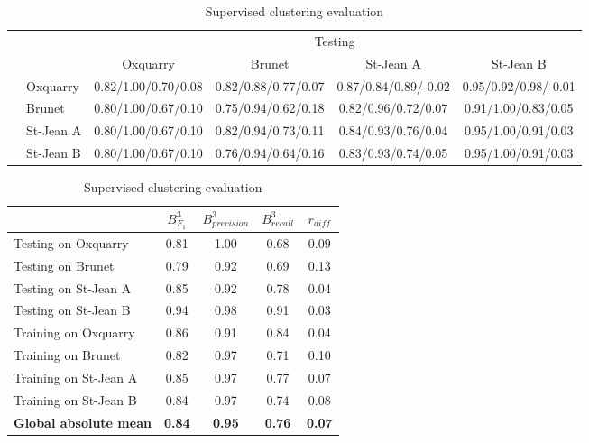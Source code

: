 \begin{table}
  \centering
  \caption{Supervised clustering evaluation}
  \label{tab:supervised_clustering}

  \label{tab:supervised_clustering_train_test}
  \begin{tabular}{l l| c c c c}
    \toprule
    \multicolumn{2}{c}{\multirow{2}{*}{}} & \multicolumn{4}{c}{Testing} \\
    \multicolumn{2}{c}{} & Oxquarry & Brunet & St-Jean A & St-Jean B \\
    \midrule
    \parbox[t]{2mm}{}
    & Oxquarry
    & 0.82/1.00/0.70/0.08
    & 0.82/0.88/0.77/0.07
    & 0.87/0.84/0.89/-0.02
    & 0.95/0.92/0.98/-0.01
    \\
    & Brunet
    & 0.80/1.00/0.67/0.10
    & 0.75/0.94/0.62/0.18
    & 0.82/0.96/0.72/0.07
    & 0.91/1.00/0.83/0.05
    \\
    & St-Jean A
    & 0.80/1.00/0.67/0.10
    & 0.82/0.94/0.73/0.11
    & 0.84/0.93/0.76/0.04
    & 0.95/1.00/0.91/0.03
    \\
    & St-Jean B
    & 0.80/1.00/0.67/0.10
    & 0.76/0.94/0.64/0.16
    & 0.83/0.93/0.74/0.05
    & 0.95/1.00/0.91/0.03
    \\
    \bottomrule
  \end{tabular}

  \vspace{0.5cm}

  \label{tab:supervised_clustering_average}
  \begin{tabular}{l c c c c}
    \toprule
    & $B^{3}_{F_1}$
    & $B^{3}_{precision}$
    & $B^{3}_{recall}$
    & $r_{diff}$ \\
    \midrule
    Testing on Oxquarry     & 0.81 & 1.00 & 0.68 & 0.09 \\
    Testing on Brunet       & 0.79 & 0.92 & 0.69 & 0.13 \\
    Testing on St-Jean A    & 0.85 & 0.92 & 0.78 & 0.04 \\
    Testing on St-Jean B    & 0.94 & 0.98 & 0.91 & 0.03 \\
    Training on Oxquarry    & 0.86 & 0.91 & 0.84 & 0.04 \\
    Training on Brunet      & 0.82 & 0.97 & 0.71 & 0.10 \\
    Training on St-Jean A   & 0.85 & 0.97 & 0.77 & 0.07 \\
    Training on St-Jean B   & 0.84 & 0.97 & 0.74 & 0.08 \\
    \textbf{Global absolute mean} & \textbf{0.84} & \textbf{0.95} & \textbf{0.76} & \textbf{0.07} \\
    \bottomrule
  \end{tabular}
\end{table}

